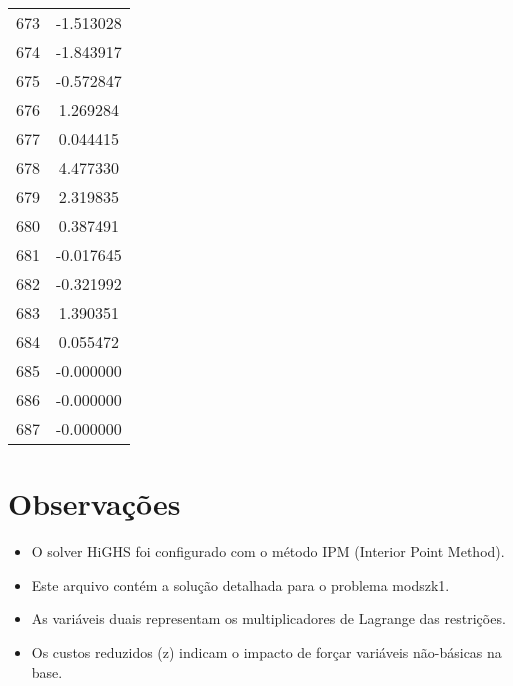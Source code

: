 \documentclass[12pt]{article}
\begin{document}
\begin{longtable}{@{}cc@{}}
673 & -1.513028 \\
674 & -1.843917 \\
675 & -0.572847 \\
676 & 1.269284 \\
677 & 0.044415 \\
678 & 4.477330 \\
679 & 2.319835 \\
680 & 0.387491 \\
681 & -0.017645 \\
682 & -0.321992 \\
683 & 1.390351 \\
684 & 0.055472 \\
685 & -0.000000 \\
686 & -0.000000 \\
687 & -0.000000 \\

\end{longtable}


\section{Observações}

\begin{itemize}
\item O solver HiGHS foi configurado com o método IPM (Interior Point Method).
\item Este arquivo contém a solução detalhada para o problema modszk1.
\item As variáveis duais representam os multiplicadores de Lagrange das restrições.
\item Os custos reduzidos (z) indicam o impacto de forçar variáveis não-básicas na base.
\end{itemize}
\end{document}
